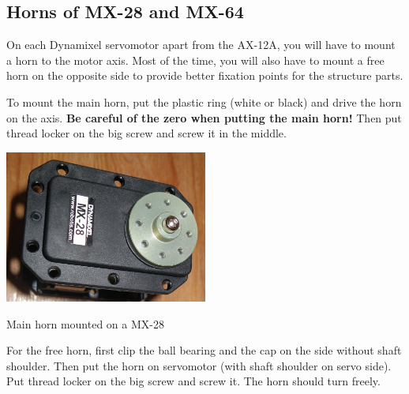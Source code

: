 \documentclass[includefoot]{article}
\begin{document}
\subsection{Horns of MX-28 and MX-64}

On each Dynamixel servomotor apart from the AX-12A, you will have to mount a horn to the motor axis. Most of the time, you will also have to mount a free horn on the opposite side to provide better fixation points for the structure parts.

To mount the main horn, put the plastic ring (white or black) and drive the horn on the axis. \textbf{Be careful of the zero when putting the main horn!} Then put thread locker on the big screw and screw it in the middle.


 \begin{center}
  \includegraphics[width=0.5\textwidth]{img/MX28N}

Main horn mounted on a MX-28
 \end{center} 
 
 For the free horn, first clip the ball bearing and the cap on the side without shaft shoulder. Then put the horn on servomotor (with shaft shoulder on servo side). Put thread locker on the big screw and screw it. The horn should turn freely.
\end{document}
